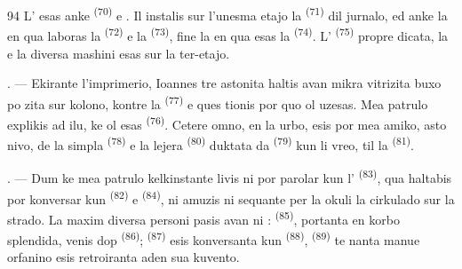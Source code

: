 \begin{VUpage}[96]{94}
\VUblancAlinea
L' esas anke  \textsuperscript{(70)} \cc
{}   e .\nl
Il instalis sur l'unesma etajo la  \textsuperscript{(71)}\nl
dil jurnalo, ed anke la  en qua laboras\nl
la  \textsuperscript{(72)} e la  \textsuperscript{(73)}, fine\nl
la  en qua esas la \cc
{} \textsuperscript{(74)}. L' \textsuperscript{(75)} propre dicata, la\nl
{} e la diversa mashini esas sur\nl
la ter-etajo.

\VUsaut{3.0mm}

. --- Ekirante l'imprimerio, Ioannes tre\nl
astonita haltis avan mikra vitrizita buxo po\cc
zita sur kolono, kontre la  \textsuperscript{(77)} e ques\cc
tionis por quo ol uzesas. Mea patrulo explikis\nl
ad ilu, ke ol esas  \textsuperscript{(76)}. Cetere\nl
omno, en la urbo, esis por mea amiko, asto\cc
nivo, de la simpla  \textsuperscript{(78)} e la lejera\nl
{} \textsuperscript{(80)} duktata da  \textsuperscript{(79)} kun li\cc
vreo, til la  \textsuperscript{(81)}.

. --- Dum ke mea patrulo kelkinstante livis\nl
ni por parolar kun l' \textsuperscript{(83)},\nl
qua haltabis por konversar kun  \textsuperscript{(82)} e\nl
{} \textsuperscript{(84)}, ni amuzis ni sequante per la okuli\nl
la cirkulado sur la strado. La maxim diversa\nl
personi pasis avan ni :  \textsuperscript{(85)},\nl
portanta en korbo  splendida, venis dop\nl
{} \textsuperscript{(86)};  \textsuperscript{(87)} esis\nl
konversanta kun  \textsuperscript{(88)},  \textsuperscript{(89)} te\cc
nanta manue orfanino esis retroiranta aden\nl
sua kuvento.
\end{VUpage}

